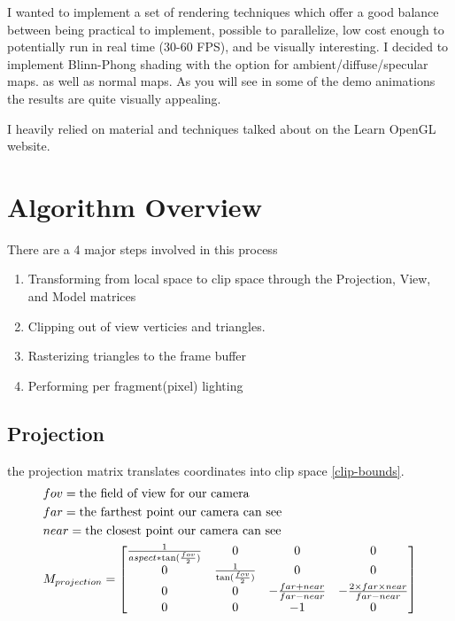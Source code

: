 \documentclass[12pt]{article}
\begin{document}
I wanted to implement a set of rendering techniques which offer a good balance between being practical to implement, possible to parallelize, low cost enough to potentially run in real time (30-60 FPS), and be visually interesting. I decided to implement Blinn-Phong shading with the option for ambient/diffuse/specular maps. as well as normal maps. As you will see in some of the demo animations the results are quite visually appealing. 

I heavily relied on material and techniques talked about on the Learn OpenGL\cite{learn-open-gl} website.

\section{Algorithm Overview}

There are a 4 major steps involved in this process

\begin{enumerate}
	\item Transforming from local space to clip space through the Projection, View, and Model matrices
	\item Clipping out of view verticies and triangles.
	\item Rasterizing triangles to the frame buffer
	\item Performing per fragment(pixel) lighting 
\end{enumerate}


\subsection{Projection}
the projection matrix translates coordinates into clip space \eqref{clip-bounds}.
\begin{gather*}\begin{align}
	&fov = \text{the field of view for our camera} \notag\\
	&far = \text{the farthest point our camera can see} \notag\\
	&near = \text{the closest point our camera can see} \notag\\
	&M_{projection} = 
	\begin{bmatrix} 
		\frac{1}{aspect*\tan(\frac{fov}2)}&0&0&0\\
		0&\frac{1}{\tan(\frac{fov}2)}&0&0\\
		0&0&-\frac{far+near}{far-near}&-\frac{2\times far \times near}{far-near}\\
		0&0&-1&0
	\end{bmatrix}
\end{align}\end{gather*}
\end{document}
